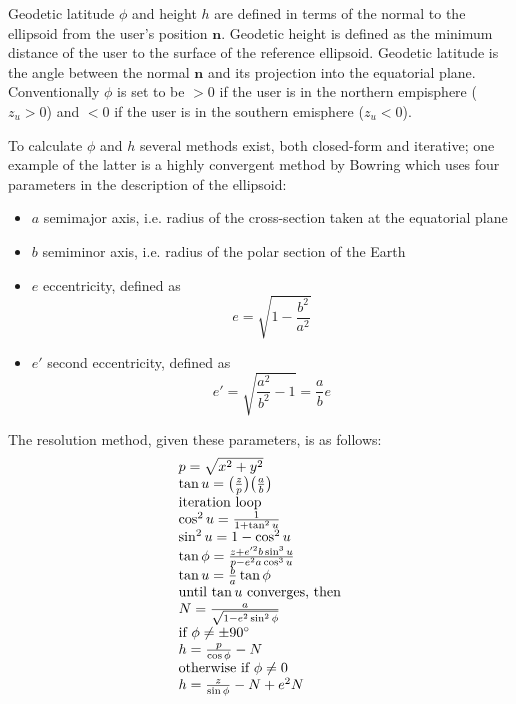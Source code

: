 Geodetic latitude $\phi$ and height $h$ are defined in terms of the normal to
the ellipsoid from the user's position $\bm{n}$. Geodetic height is defined as
the minimum distance of the user to the surface of the reference ellipsoid.
Geodetic latitude is the angle between the normal $\bm{n}$ and its projection
into the equatorial plane. Conventionally $\phi$ is set to be $> 0$ if the user
is in the northern empisphere ($z_u > 0$) and $< 0$ if the user is in the
southern emisphere ($z_u < 0$).

To calculate $\phi$ and $h$ several methods exist, both closed-form and
iterative; one example of the latter is a highly convergent method by Bowring
which uses four parameters in the description of the ellipsoid:
\begin{itemize}
\item $a$ semimajor axis, i.e. radius of the cross-section taken at the
  equatorial plane
\item $b$ semiminor axis, i.e. radius of the polar section of the Earth
\item $e$ eccentricity, defined as 
  \[
    e = \sqrt{1 - \frac{b^2}{a^2}}
  \]
\item $e'$ second eccentricity, defined as
  \[
    e' = \sqrt{\frac{a^2}{b^2} - 1} = \frac{a}{b}e
  \]
\end{itemize}
The resolution method, given these parameters, is as follows:
\[
  \begin{array}{l}
    p = \sqrt{x^2 + y^2} \\
    \tan u = \big(\frac{z}{p}\big)\big(\frac{a}{b}\big) \\
    \text{iteration loop} \\
    \cos^2 u = \frac{1}{1+\tan^2 u} \\
    \sin^2 u = 1 - \cos^2 u \\
    \tan \phi = \frac{z + e'^2 b \sin^3 u}{p - e^2 a \cos^3 u} \\
    \tan u = \frac{b}{a}\tan \phi \\
    \text{until $\tan u$ converges, then} \\
    N = \frac{a}{\sqrt{1 - e^2 \sin^2 \phi}} \\
    \text{if $\phi \neq \pm 90 \degree $} \\
    h = \frac{p}{\cos \phi} - N \\
    \text{otherwise if $\phi \neq 0$} \\
    h = \frac{z}{\sin \phi} - N + e^2N
  \end{array}
\]

